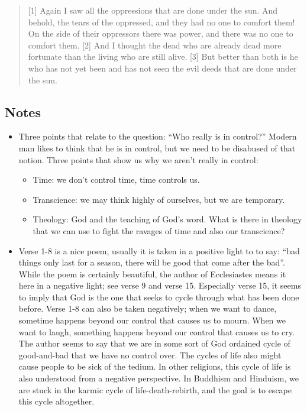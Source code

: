 \begin{quote}
    [1] Again I saw all the oppressions that are done under the sun.  And
    behold, the tears of the oppressed, and they had no one to comfort them!
    On the side of their oppressors there was power, and there was no one to
    comfort them.  [2] And I thought the dead who are already dead more
    fortunate than the living who are still alive.  [3] But better than both
    is he who has not yet been and has not seen the evil deeds that are done
    under the sun.
  \end{quote}
\subsection*{Notes}
\begin{itemize}
  \item{Three points that relate to the question: ``Who really is in
  control?'' Modern man likes to think that he is in control, but we need to
  be disabused of that notion.  Three points that show us why we aren't
  really in control:
  \begin{itemize}
    \item{Time: we don't control time, time controls us.}
    \item{Transcience: we may think highly of ourselves, but we are temporary.}
    \item{Theology: God and the teaching of God's word.  What is there in
    theology that we can use to fight the ravages of time and also our
    transcience?}
  \end{itemize}}
  \item{Verse 1-8 is a nice poem, usually it is taken in a positive light to
  to say: ``bad things only last for a season, there will be good that come
  after the bad''.  While the poem is certainly beautiful, the author of
  Ecclesiastes means it here in a negative light; see verse 9 and verse 15.
  Especially verse 15, it seems to imply that God is the one that seeks to
  cycle through what has been done before.  Verse 1-8 can also be taken
  negatively; when we want to dance, sometime happens beyond our control that
  causes us to mourn.  When we want to laugh, something happens beyond our
  control that causes us to cry.  The author seems to say that we are in some
  sort of God ordained cycle of good-and-bad that we have no control over.
  The cycles of life also might cause people to be sick of the tedium.  In
  other religions, this cycle of life is also understood from a negative
  perspective.  In Buddhism and Hinduism, we are stuck in the karmic cycle of
  life-death-rebirth, and the goal is to escape this cycle altogether.}

\end{itemize}
